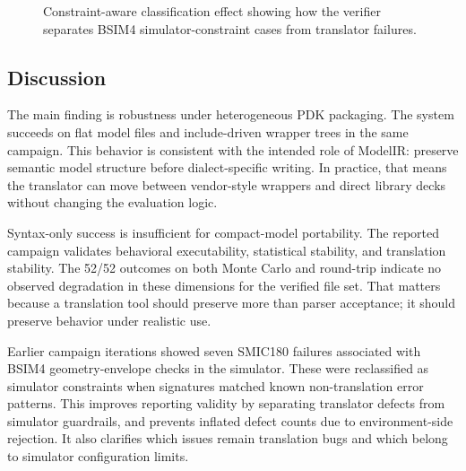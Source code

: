 \documentclass[10pt,twocolumn]{article}
\begin{document}
\begin{figure}[t]
\centering
{}
\caption{Constraint-aware classification effect showing how the verifier separates BSIM4 simulator-constraint cases from translator failures.}
\label{fig:constraint_classification}
\end{figure}

\subsection{Discussion}
The main finding is robustness under heterogeneous PDK packaging. The system succeeds on flat model files and include-driven wrapper trees in the same campaign. This behavior is consistent with the intended role of ModelIR: preserve semantic model structure before dialect-specific writing. In practice, that means the translator can move between vendor-style wrappers and direct library decks without changing the evaluation logic.

Syntax-only success is insufficient for compact-model portability. The reported campaign validates behavioral executability, statistical stability, and translation stability. The 52/52 outcomes on both Monte Carlo and round-trip indicate no observed degradation in these dimensions for the verified file set. That matters because a translation tool should preserve more than parser acceptance; it should preserve behavior under realistic use.

Earlier campaign iterations showed seven SMIC180 failures associated with BSIM4 geometry-envelope checks in the simulator. These were reclassified as simulator constraints when signatures matched known non-translation error patterns. This improves reporting validity by separating translator defects from simulator guardrails, and prevents inflated defect counts due to environment-side rejection. It also clarifies which issues remain translation bugs and which belong to simulator configuration limits.
\end{document}
